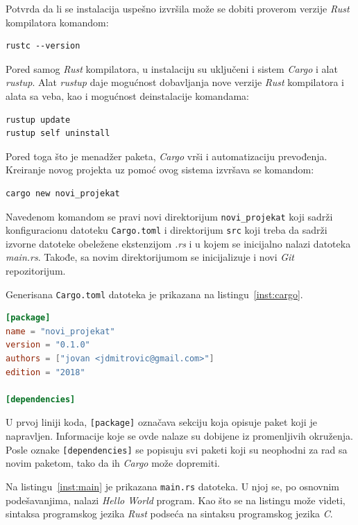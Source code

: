 \documentclass[12pt,oneside]{memoir}
\begin{document}
\noindent
Potvrda da li se instalacija uspešno izvršila može se dobiti proverom verzije
\emph{Rust} kompilatora komandom:

\begin{lstlisting}[language={}, style=text]
rustc --version
\end{lstlisting}

Pored samog \emph{Rust} kompilatora, u instalaciju su uključeni i
sistem \emph{Cargo} i alat \emph{rustup}. Alat \emph{rustup} daje mogućnost
dobavljanja nove verzije \emph{Rust} kompilatora i alata sa veba, kao i
mogućnost deinstalacije komandama:

\begin{lstlisting}[language={}, style=text]
rustup update
rustup self uninstall
\end{lstlisting}

Pored toga što je menadžer paketa, \emph{Cargo} vrši i automatizaciju
prevođenja. Kreiranje novog projekta uz pomoć ovog sistema izvršava
se komandom:

\begin{lstlisting}[language={}, style=text]
cargo new novi_projekat
\end{lstlisting}

Navedenom komandom se pravi novi direktorijum \texttt{novi\_projekat} koji
sadrži konfiguracionu datoteku \texttt{Cargo.toml} i direktorijum \texttt{src}
koji treba da sadrži izvorne datoteke obeležene ekstenzijom \emph{.rs}
i u kojem se inicijalno nalazi datoteka \emph{main.rs}. Takođe, sa novim direktorijumom se
inicijalizuje i novi \emph{Git} repozitorijum.

Generisana \texttt{Cargo.toml} datoteka je prikazana na listingu~\ref{inst:cargo}.

\begin{lstlisting}[language=TOML,
                   caption={Inicijalna \emph{Cargo.toml} datoteka},
                   label={inst:cargo}]
[package]
name = "novi_projekat"
version = "0.1.0"
authors = ["jovan <jdmitrovic@gmail.com>"]
edition = "2018"

[dependencies]
\end{lstlisting}

U prvoj liniji koda, \texttt{[package]} označava sekciju koja opisuje
paket koji je napravljen. Informacije koje se ovde nalaze su dobijene
iz promenljivih okruženja. Posle oznake \texttt{[dependencies]} se
popisuju svi paketi koji su neophodni za rad sa novim paketom,
tako da ih \emph{Cargo} može dopremiti.

Na listingu~\ref{inst:main} je prikazana \texttt{main.rs} datoteka. U njoj se, po osnovnim
podešavanjima, nalazi \emph{Hello World} program. Kao što se na listingu može videti,
sintaksa programskog jezika \textit{Rust} podseća na sintaksu programskog jezika
\textit{C}.
\end{document}
